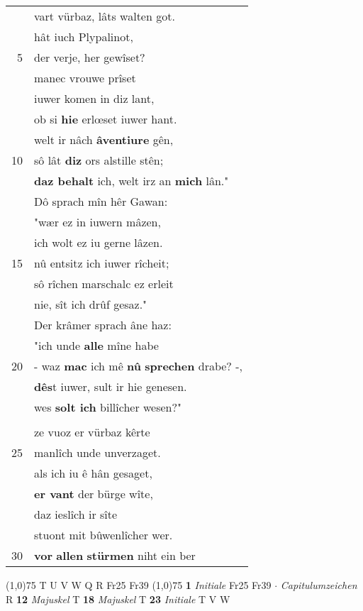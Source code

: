 \documentclass[8pt,a4paper,notitlepage]{article}
\begin{document}
\begin{table}[ht]
\begin{minipage}[t]{0.5\linewidth}
\begin{tabular}{rl}
 & vart vürbaz, lâts walten got.\\ 
 & hât iuch Plypalinot,\\ 
5 & der verje, her gewîset?\\ 
 & manec vrouwe prîset\\ 
 & iuwer komen in diz lant,\\ 
 & ob si \textbf{hie} erlœset iuwer hant.\\ 
 & welt ir nâch \textbf{âventiure} gên,\\ 
10 & sô lât \textbf{diz} ors alstille stên;\\ 
 & \textbf{daz behalt} ich, welt irz an \textbf{mich} lân."\\ 
 & Dô sprach mîn hêr Gawan:\\ 
 & "wær ez in iuwern mâzen,\\ 
 & ich wolt ez iu gerne lâzen.\\ 
15 & nû entsitz ich iuwer rîcheit;\\ 
 & sô rîchen marschalc ez erleit\\ 
 & nie, sît ich drûf gesaz."\\ 
 & Der krâmer sprach âne haz:\\ 
 & "ich unde \textbf{alle} mîne habe\\ 
20 & - waz \textbf{mac} ich mê \textbf{nû} \textbf{sprechen} drabe? -,\\ 
 & \textbf{dês}t iuwer, sult ir hie genesen.\\ 
 & wes \textbf{solt ich} billîcher wesen?"\\ 
 & \textit{\begin{large}G\end{large}}awan sîn ellen lêrte,\\ 
 & ze vuoz er vürbaz kêrte\\ 
25 & manlîch unde unverzaget.\\ 
 & als ich iu ê hân gesaget,\\ 
 & \textbf{er vant} der bürge wîte,\\ 
 & daz ieslîch ir sîte\\ 
 & stuont mit bûwenlîcher wer.\\ 
30 & \textbf{vor} \textbf{allen} \textbf{stürmen} niht ein ber\\ 
\end{tabular}
\scriptsize
\line(1,0){75} \newline
T U V W Q R Fr25 Fr39 \newline
\line(1,0){75} \newline
\textbf{1} \textit{Initiale} Fr25 Fr39   $\cdot$ \textit{Capitulumzeichen} R  \textbf{12} \textit{Majuskel} T  \textbf{18} \textit{Majuskel} T  \textbf{23} \textit{Initiale} T V W  \newline

\end{minipage}
\end{table}
\end{document}
